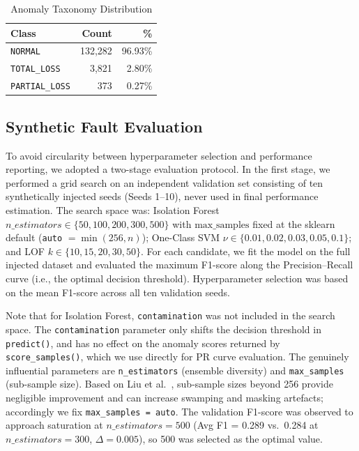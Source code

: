 \documentclass[11pt,a4paper,twoside]{article}
\begin{document}

\begin{table}[H]
\caption{Anomaly Taxonomy Distribution}
\begin{center}
\begin{tabular}{lrr}
\toprule
\textbf{Class} & \textbf{Count} & \textbf{\%} \\
\midrule
\texttt{NORMAL} & 132,282 & 96.93\% \\
\texttt{TOTAL\_LOSS} & 3,821 & 2.80\% \\
\texttt{PARTIAL\_LOSS} & 373 & 0.27\% \\
\bottomrule
\end{tabular}
\label{tab:anomaly_dist}
\end{center}
\end{table}


\subsection{Synthetic Fault Evaluation}
\label{sec:synthetic_eval}
To avoid circularity between hyperparameter selection and performance
reporting, we adopted a two-stage evaluation protocol. In the first
stage, we performed a grid search on an independent validation set
consisting of ten synthetically injected seeds (Seeds 1--10), never
used in final performance estimation. The search space was:
Isolation Forest $n\_estimators \in \{50, 100, 200, 300, 500\}$ with
$\mathrm{max\_samples}$ fixed at the sklearn default (\texttt{auto}
$= \min(256, n)$); One-Class SVM $\nu \in \{0.01, 0.02, 0.03, 0.05,
0.1\}$; and LOF $k \in \{10, 15, 20, 30, 50\}$. For each candidate,
we fit the model on the full injected dataset and evaluated the
maximum F1-score along the Precision--Recall curve (i.e., the optimal
decision threshold). Hyperparameter selection was based on the mean
F1-score across all ten validation seeds.

Note that for Isolation Forest, \texttt{contamination} was not included
in the search space. The \texttt{contamination} parameter only shifts
the decision threshold in \texttt{predict()}, and has no effect on the
anomaly scores returned by \texttt{score\_samples()}, which we use
directly for PR curve evaluation. The genuinely influential parameters
are \texttt{n\_estimators} (ensemble diversity) and
\texttt{max\_samples} (sub-sample size). Based on Liu et al.\
\cite{liu2012}, sub-sample sizes beyond 256 provide negligible
improvement and can increase swamping and masking artefacts; accordingly
we fix \texttt{max\_samples = auto}. The validation F1-score was
observed to approach saturation at $n\_estimators = 500$ (Avg F1 =
0.289 vs.\ 0.284 at $n\_estimators = 300$, $\Delta = 0.005$), so 500
was selected as the optimal value.
\end{document}
